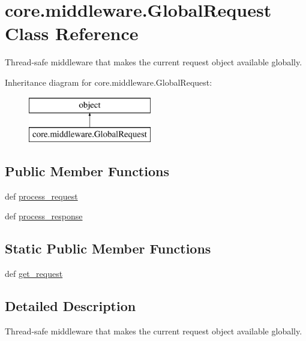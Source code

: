 \hypertarget{classcore_1_1middleware_1_1GlobalRequest}{\section{core.\-middleware.\-Global\-Request Class Reference}
\label{classcore_1_1middleware_1_1GlobalRequest}
}


Thread-\/safe middleware that makes the current request object available globally.  


Inheritance diagram for core.\-middleware.\-Global\-Request\-:\begin{figure}[H]
\begin{center}
\leavevmode
\includegraphics[height=2.000000cm]{classcore_1_1middleware_1_1GlobalRequest}
\end{center}
\end{figure}
\subsection*{Public Member Functions}
\begin{DoxyCompactItemize}
\item 
def \hyperlink{classcore_1_1middleware_1_1GlobalRequest_a16dcd9fd5dc1fb106d99cc4882808975}{process\-\_\-request}
\item 
def \hyperlink{classcore_1_1middleware_1_1GlobalRequest_a38cbb5a1292527739123289504048485}{process\-\_\-response}
\end{DoxyCompactItemize}
\subsection*{Static Public Member Functions}
\begin{DoxyCompactItemize}
\item 
def \hyperlink{classcore_1_1middleware_1_1GlobalRequest_a9e7b4d4549a961a8914f617cc9987778}{get\-\_\-request}
\end{DoxyCompactItemize}


\subsection{Detailed Description}
Thread-\/safe middleware that makes the current request object available globally. 

